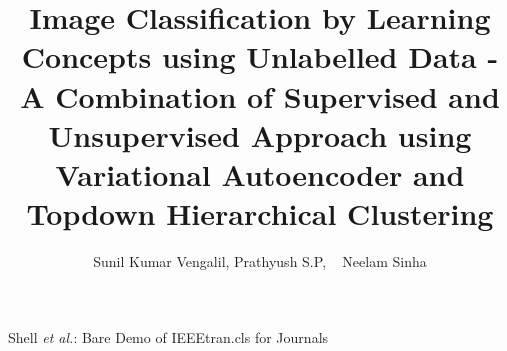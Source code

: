 \documentclass[journal]{IEEEtran}
\begin{document}
%
\title{ Image Classification by Learning Concepts using Unlabelled Data  - A Combination of Supervised and Unsupervised Approach using Variational Autoencoder and Topdown Hierarchical Clustering}
%
%
%

\author{Sunil Kumar Vengalil, Prathyush S.P, ~\IEEEmembership
        Neelam Sinha }


% 
%



%
{Shell \MakeLowercase{\textit{et al.}}: Bare Demo of IEEEtran.cls for Journals}
% 
\end{document}
